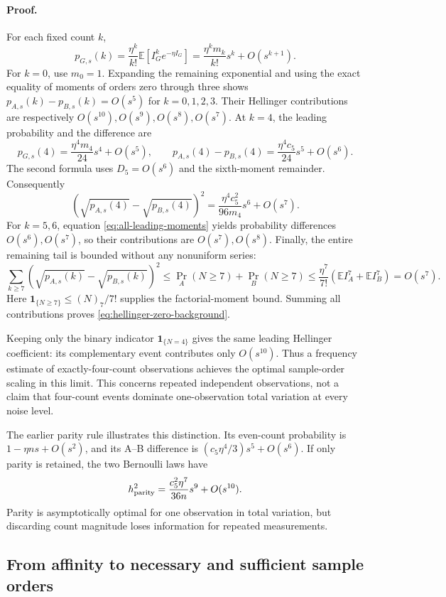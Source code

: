 \paragraph{Proof.}
For each fixed count $k$,
\[
 p_{G,s}(k)=\frac{\eta^k}{k!}\mathbb E[I_G^k e^{-\eta I_G}]
 =\frac{\eta^km_k}{k!}s^k+O(s^{k+1}).
\]
For $k=0$, use $m_0=1$. Expanding the remaining exponential and using the
exact equality of moments of orders zero through three shows
$p_{A,s}(k)-p_{B,s}(k)=O(s^5)$ for $k=0,1,2,3$. Their Hellinger contributions
are respectively $O(s^{10}),O(s^9),O(s^8),O(s^7)$.
At $k=4$, the leading probability and the difference are
\[
 p_{G,s}(4)=\frac{\eta^4m_4}{24}s^4+O(s^5),\qquad
 p_{A,s}(4)-p_{B,s}(4)=\frac{\eta^4c_5}{24}s^5+O(s^6).
\]
The second formula uses $D_5=O(s^6)$ and the sixth-moment remainder.
Consequently
\[
 (\sqrt{p_{A,s}(4)}-\sqrt{p_{B,s}(4)})^2
 =\frac{\eta^4c_5^2}{96m_4}s^6+O(s^7).
\]
For $k=5,6$, equation \eqref{eq:all-leading-moments} yields probability
differences $O(s^6),O(s^7)$, so their contributions are $O(s^7),O(s^8)$.
Finally, the entire remaining tail is bounded without any nonuniform series:
\[
 \sum_{k\ge7}(\sqrt{p_{A,s}(k)}-\sqrt{p_{B,s}(k)})^2
 \le\Pr_A(N\ge7)+\Pr_B(N\ge7)
 \le\frac{\eta^7}{7!}(\mathbb E I_A^7+\mathbb E I_B^7)=O(s^7).
\]
Here $\mathbf1_{\{N\ge7\}}\le (N)_7/7!$ supplies the factorial-moment
bound. Summing all contributions proves \eqref{eq:hellinger-zero-background}.

Keeping only the binary indicator $\mathbf1_{\{N=4\}}$ gives the same
leading Hellinger coefficient: its complementary event contributes only
$O(s^{10})$. Thus a frequency estimate of exactly-four-count observations
achieves the optimal sample-order scaling in this limit. This concerns
repeated independent observations, not a claim that four-count events
dominate one-observation total variation at every noise level.

The earlier parity rule illustrates this distinction. Its even-count
probability is $1-\eta ns+O(s^2)$, and its A--B difference is
$(c_5\eta^4/3)s^5+O(s^6)$. If only parity is retained, the two Bernoulli
laws have
\[
 h^2_{\rm parity}=\frac{c_5^2\eta^7}{36n}s^9+O(s^{10}).
\]
Parity is asymptotically optimal for one observation in total variation,
but discarding count magnitude loses information for repeated measurements.

\subsection{From affinity to necessary and sufficient sample orders}

